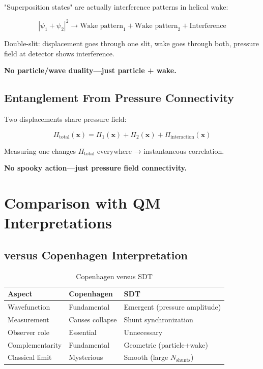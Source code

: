 "Superposition states" are actually interference patterns in helical wake:

\begin{equation}
|\psi_1 + \psi_2|^2 \to \text{Wake pattern}_1 + \text{Wake pattern}_2 + \text{Interference}
\end{equation}

Double-slit: displacement goes through one slit, wake goes through both, pressure field at detector shows interference.

\textbf{No particle/wave duality—just particle + wake.}

\subsection{Entanglement From Pressure Connectivity}

Two displacements share pressure field:

\begin{equation}
\Pi_{\text{total}}(\mathbf{x}) = \Pi_1(\mathbf{x}) + \Pi_2(\mathbf{x}) + \Pi_{\text{interaction}}(\mathbf{x})
\end{equation}

Measuring one changes $\Pi_{\text{total}}$ everywhere → instantaneous correlation.

\textbf{No spooky action—just pressure field connectivity.}

\section{Comparison with QM Interpretations}

\subsection{versus Copenhagen Interpretation}

\begin{table}[h]
\centering
\begin{tabular}{|l|l|l|}
\hline
\textbf{Aspect} & \textbf{Copenhagen} & \textbf{SDT} \\
\hline
Wavefunction & Fundamental & Emergent (pressure amplitude) \\
Measurement & Causes collapse & Shunt synchronization \\
Observer role & Essential & Unnecessary \\
Complementarity & Fundamental & Geometric (particle+wake) \\
Classical limit & Mysterious & Smooth (large $N_{\text{shunts}}$) \\
\hline
\end{tabular}
\caption{Copenhagen versus SDT}
\end{table}

